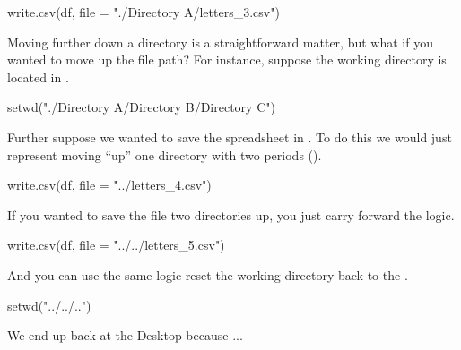 \begin{inR}
write.csv(df, file = "./Directory A/letters_3.csv")
\end{inR}

\vspace{2em}


Moving further down a directory is a straightforward matter, but what if you wanted to move up the file path? For instance, suppose the working directory is located in .

\begin{inR}
setwd("./Directory A/Directory B/Directory C")
\end{inR}

\medskip

\noindent Further suppose we wanted to save the spreadsheet in .  To do this we would just represent moving ``up'' one directory with two periods ().

\begin{inR}
write.csv(df, file = "../letters_4.csv")
\end{inR}

\vspace{2em}


\noindent
If you wanted to save the file two directories up, you just carry forward the logic.

\begin{inR}
write.csv(df, file = "../../letters_5.csv")
\end{inR}

\vspace{2em}


\noindent
And you can use the same logic reset the working directory back to the .

\begin{inR}
setwd("../../..")
\end{inR}

\medskip

\noindent We end up back at the Desktop because ...

